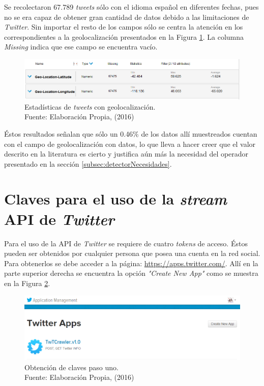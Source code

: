 Se recolectaron 67.789 \textit{tweets} sólo con el idioma español en diferentes fechas, pues no se era capaz de obtener gran cantidad de datos debido a las limitaciones de \textit{Twitter}. Sin importar el resto de los campos sólo se centra la atención en los correspondientes a la geolocalización presentados en la Figura \ref{fig:RMResult}. La columna \textit{Missing} indica que ese campo se encuentra vacío.

\begin{figure}[H]
        \centering
        \captionsetup{justification=centering}
        \includegraphics[scale=0.6]{images/ResultadoRapidMiner.png}
        \caption[Estadísticas de \textit{tweets} con geolocalización.]{Estadísticas de \textit{tweets} con geolocalización.\\Fuente: Elaboración Propia, (2016)}
        \label{fig:RMResult}
\end{figure}

Éstos resultados señalan que sólo un 0.46\% de los datos allí muestreados cuentan con el campo de geolocalización con datos, lo que lleva a hacer creer que el valor descrito en la literatura es cierto y justifica aún más la necesidad del operador presentado en la sección \ref{subsec:detectorNecesidades}.

\section{Claves para el uso de la \textit{stream} API de \textit{Twitter}}
\label{apendice:clavesApi}

Para el uso de la API de \textit{Twitter} se requiere de cuatro \textit{tokens} de acceso. Éstos pueden ser obtenidos por cualquier persona que posea una cuenta en la red social. Para obtenerlos se debe acceder a la página: \url{https://apps.twitter.com/}. Allí en la parte superior derecha se encuentra la opción \textit{"Create New App"} como se muestra en la Figura \ref{fig:CreateNewApp}.

\begin{figure}[H]
        \centering
        \captionsetup{justification=centering}
        \includegraphics[scale=0.6]{images/CreateNewApp.png}
        \caption[Obtención de claves paso uno.]{Obtención de claves paso uno.\\Fuente: Elaboración Propia, (2016)}
        \label{fig:CreateNewApp}
\end{figure}

